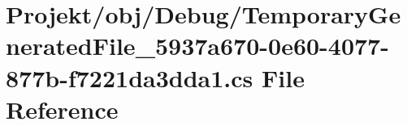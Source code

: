 \hypertarget{_temporary_generated_file__5937a670-0e60-4077-877b-f7221da3dda1_8cs}{}\section{Projekt/obj/\+Debug/\+Temporary\+Generated\+File\+\_\+5937a670-\/0e60-\/4077-\/877b-\/f7221da3dda1.cs File Reference}
\label{_temporary_generated_file__5937a670-0e60-4077-877b-f7221da3dda1_8cs}
